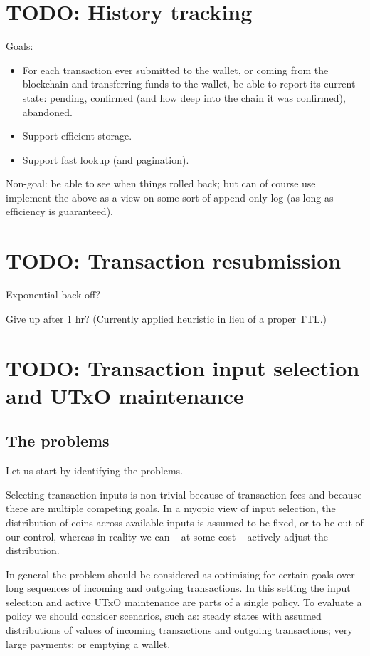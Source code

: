 \documentclass{article}
\begin{document}
\clearpage


\section{TODO: History tracking}

Goals:

\begin{itemize}
\item For each transaction ever submitted to the wallet, or coming from the
blockchain and transferring funds to the wallet, be able to report its current
state: pending, confirmed (and how deep into the chain it was confirmed),
abandoned.
\item Support efficient storage.
\item Support fast lookup (and pagination).
\end{itemize}

Non-goal: be able to see when things rolled back; but can of course use
implement the above as a view on some sort of append-only log
(as long as efficiency is guaranteed).

\section{TODO: Transaction resubmission}

Exponential back-off?

Give up after 1 hr? (Currently applied heuristic in lieu of a proper TTL.)

\section{TODO: Transaction input selection and UTxO maintenance}

\subsection{The problems}

Let us start by identifying the problems.

Selecting transaction inputs is non-trivial because of transaction fees and
because there are multiple competing goals. In a myopic view of input
selection, the distribution of coins across available inputs is assumed to be
fixed, or to be out of our control, whereas in reality we can -- at some cost
-- actively adjust the distribution.

In general the problem should be considered as optimising for certain goals
over long sequences of incoming and outgoing transactions. In this setting
the input selection and active UTxO maintenance are parts of a single policy.
To evaluate a policy we should consider scenarios, such as: steady states with
assumed distributions of values of incoming transactions and outgoing
transactions; very large payments; or emptying a wallet.
\end{document}
